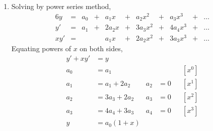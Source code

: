 \begin{enumerate}
    \item Solving by power series method,
          \begin{alignat}{6}
              y     & ={}      & a_0   & {}+{}    & a_1 x  &
              {}+{} & a_2 x^2  & {}+{} & a_3x^3   & {}+{}  & \dots \\
              y'    & ={}      & a_1   & {}+{}    & 2a_2 x &
              {}+{} & 3a_3 x^2 & {}+{} & 4a_4 x^3 & {}+{}  & \dots \\
              xy'   & ={}      &       &          & a_1 x  &
              {}+{} & 2a_2 x^2 & {}+{} & 3a_3 x^3 & {}+{}  & \dots
          \end{alignat}
          Equating powers of $ x $ on both sides, \\
          \begin{align}
              y' + xy' & = y                                  \\
              a_0      & = a_1         &     &     &  & [x^0] \\
              a_1      & = a_1 + 2a_2  & a_2 & = 0 &  & [x^1] \\
              a_2      & = 3a_3 + 2a_2 & a_3 & = 0 &  & [x^2] \\
              a_3      & = 4a_4 + 3a_3 & a_4 & = 0 &  & [x^3] \\
              y        & = a_0(1 + x)
          \end{align}


\end{enumerate}

